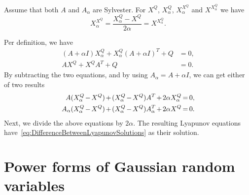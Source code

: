 \documentclass[twocolumn]{autart}
\begin{document}
\begin{thm}\label{th:DifferenceBetweenLyapunovSolutions}
Assume that both $A$ and $A_\alpha$ are Sylvester. For $X^Q$, $X_\alpha^Q$, $X_\alpha^{X^Q}$ and $X^{X_\alpha^Q}$ we have
\begin{equation}
X_\alpha^{X^Q} = \frac{X_\alpha^Q - X^Q}{2\alpha} = X^{X_\alpha^Q}. \label{eq:DifferenceBetweenLyapunovSolutions}
\end{equation}
\end{thm}
\begin{pf}
Per definition, we have
\begin{align}
(A + \alpha I) X_\alpha^Q + X_\alpha^Q (A + \alpha I)^T + Q & = 0, \\
A X^Q + X^Q A^T + Q & = 0.
\end{align}
By subtracting the two equations, and by using $A_\alpha = A + \alpha I$, we can get either of two results
\begin{align}
A (X_\alpha^Q \hspace{-1pt}-\hspace{-1pt} X^Q) \hspace{-1pt}+\hspace{-1pt} (X_\alpha^Q \hspace{-1pt}-\hspace{-1pt} X^Q) A^T \hspace{-1pt}+\hspace{-1pt} 2\alpha X_\alpha^Q & \hspace{-1pt}=\hspace{-1pt} 0, \\
A_\alpha (X_\alpha^Q \hspace{-1pt}-\hspace{-1pt} X^Q) \hspace{-1pt}+\hspace{-1pt} (X_\alpha^Q \hspace{-1pt}-\hspace{-1pt} X^Q) A_\alpha^T \hspace{-1pt}+\hspace{-1pt} 2\alpha X^Q & \hspace{-1pt}=\hspace{-1pt} 0.
\end{align}
Next, we divide the above equations by $2\alpha$. The resulting Lyapunov equations have~\eqref{eq:DifferenceBetweenLyapunovSolutions} as their solution.
\end{pf}

\section{Power forms of Gaussian random variables} \label{s:GaussianPowerForms}
\end{document}
